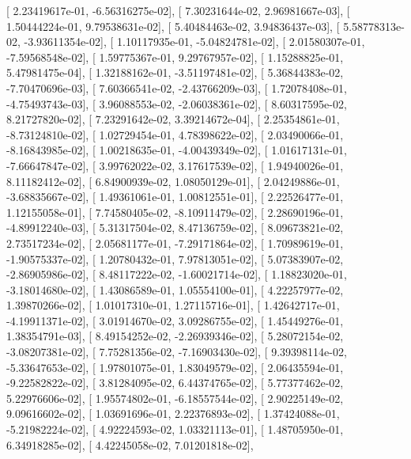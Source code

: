 \documentclass{article}
\begin{document}
       [  2.23419617e-01,  -6.56316275e-02],
       [  7.30231644e-02,   2.96981667e-03],
       [  1.50444224e-01,   9.79538631e-02],
       [  5.40484463e-02,   3.94836437e-03],
       [  5.58778313e-02,  -3.93611354e-02],
       [  1.10117935e-01,  -5.04824781e-02],
       [  2.01580307e-01,  -7.59568548e-02],
       [  1.59775367e-01,   9.29767957e-02],
       [  1.15288825e-01,   5.47981475e-04],
       [  1.32188162e-01,  -3.51197481e-02],
       [  5.36844383e-02,  -7.70470696e-03],
       [  7.60366541e-02,  -2.43766209e-03],
       [  1.72078408e-01,  -4.75493743e-03],
       [  3.96088553e-02,  -2.06038361e-02],
       [  8.60317595e-02,   8.21727820e-02],
       [  7.23291642e-02,   3.39214672e-04],
       [  2.25354861e-01,  -8.73124810e-02],
       [  1.02729454e-01,   4.78398622e-02],
       [  2.03490066e-01,  -8.16843985e-02],
       [  1.00218635e-01,  -4.00439349e-02],
       [  1.01617131e-01,  -7.66647847e-02],
       [  3.99762022e-02,   3.17617539e-02],
       [  1.94940026e-01,   8.11182412e-02],
       [  6.84900939e-02,   1.08050129e-01],
       [  2.04249886e-01,  -3.68835667e-02],
       [  1.49361061e-01,   1.00812551e-01],
       [  2.22526477e-01,   1.12155058e-01],
       [  7.74580405e-02,  -8.10911479e-02],
       [  2.28690196e-01,  -4.89912240e-03],
       [  5.31317504e-02,   8.47136759e-02],
       [  8.09673821e-02,   2.73517234e-02],
       [  2.05681177e-01,  -7.29171864e-02],
       [  1.70989619e-01,  -1.90575337e-02],
       [  1.20780432e-01,   7.97813051e-02],
       [  5.07383907e-02,  -2.86905986e-02],
       [  8.48117222e-02,  -1.60021714e-02],
       [  1.18823020e-01,  -3.18014680e-02],
       [  1.43086589e-01,   1.05554100e-01],
       [  4.22257977e-02,   1.39870266e-02],
       [  1.01017310e-01,   1.27115716e-01],
       [  1.42642717e-01,  -4.19911371e-02],
       [  3.01914670e-02,   3.09286755e-02],
       [  1.45449276e-01,   1.38354791e-03],
       [  8.49154252e-02,  -2.26939346e-02],
       [  5.28072154e-02,  -3.08207381e-02],
       [  7.75281356e-02,  -7.16903430e-02],
       [  9.39398114e-02,  -5.33647653e-02],
       [  1.97801075e-01,   1.83049579e-02],
       [  2.06435594e-01,  -9.22582822e-02],
       [  3.81284095e-02,   6.44374765e-02],
       [  5.77377462e-02,   5.22976606e-02],
       [  1.95574802e-01,  -6.18557544e-02],
       [  2.90225149e-02,   9.09616602e-02],
       [  1.03691696e-01,   2.22376893e-02],
       [  1.37424088e-01,  -5.21982224e-02],
       [  4.92224593e-02,   1.03321113e-01],
       [  1.48705950e-01,   6.34918285e-02],
       [  4.42245058e-02,   7.01201818e-02],
\end{document}
